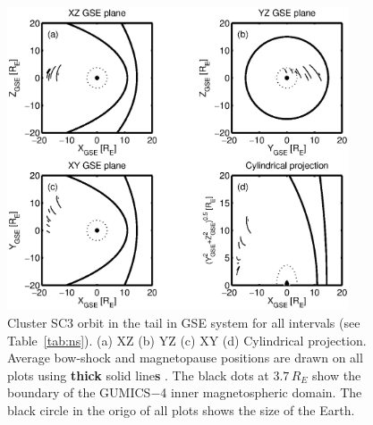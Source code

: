 \documentclass[linenumbers,draft]{agujournal}
\begin{document}
\begin{figure}[h]
\centering
\includegraphics[width=0.9\textwidth,angle=0]{swe-2020-corr-f12}  
\caption{Cluster SC3 orbit in the tail in GSE system for all intervals (see Table~\ref{tab:ns}). (a) XZ (b) YZ (c) XY (d) Cylindrical projection. Average bow-shock and magnetopause positions are drawn on all plots using \textbf{thick} solid line\textbf{s} \citep[][respectively]{peredo95:_three_alfven_mach,tsyganenko95:_model_earth}. The black dots at $3.7\,R_E$ show the boundary of the GUMICS$-$4 inner magnetospheric domain. The black circle in the origo of all plots shows the size of the Earth.}
\label{fig:nsorbit}
\end{figure}



\pagebreak
\end{document}
